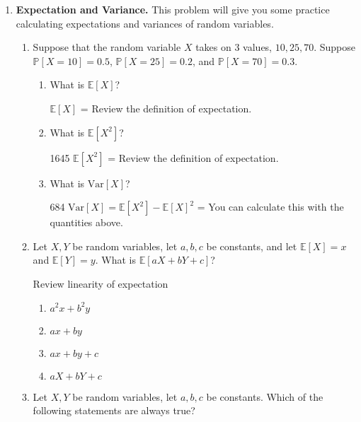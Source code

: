 \documentclass[11pt,preview]{standalone} %
\date{} %
\newcommand{\Prob}{\mathbb{P}}
\newcommand{\E}{\mathbb{E}}
\newcommand{\Var}{\text{Var}}
\begin{document}

\begin{enumerate}
\item {\bf Expectation and Variance.} This problem will give you some practice calculating expectations and variances of random variables.
\begin{enumerate}
\item Suppose that the random variable $X$ takes on 3 values, $10, 25, 70$. Suppose $\Prob[X =10] = 0.5$, $\Prob[X = 25] = 0.2$, and $\Prob[X = 70] = 0.3$. 
\begin{enumerate}
\item What is $\E[X]$?
\begin{Freeform}{31}
$\E[X]$ = 
\Hint Review the definition of expectation.
\end{Freeform}
\item What is $\E[X^2]$?
\begin{Freeform}{1645}
$\E[X^2]$ = 
\Hint Review the definition of expectation.
\end{Freeform}
\item What is $\Var[X]$?
\begin{Freeform}{684}
$\Var[X] = \E[X^2] - \E[X]^2$ = 
\Hint You can calculate this with the quantities above.
\end{Freeform}
\end{enumerate}
\item Let $X, Y$ be random variables, let $a,b,c$ be constants, and let $\E[X] = x$ and $\E[Y] = y$. What is $\E[aX + bY + c]$?
\begin{Choices}
Review linearity of expectation
\begin{enumerate}
\FalseChoice\item $a^2x + b^2y$
\FalseChoice\item $ax + by$
\TrueChoice\item $ax + by + c$
\FalseChoice\item $aX + bY + c$
\end{enumerate}
\end{Choices}
\item Let $X, Y$ be random variables, let $a,b,c$ be constants. Which of the following statements are always true?
\begin{Multi}

\end{Multi}
\end{enumerate}
\end{enumerate}
\end{document}
